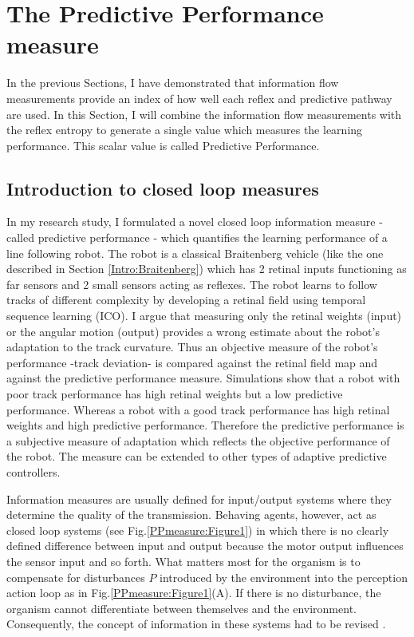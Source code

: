 \section{The Predictive Performance measure \label{Chapter8:Predictive Performance}}

In the previous Sections, I have demonstrated that information flow measurements 
provide an index of how well each reflex and predictive pathway are used.
In this Section, I will combine the information flow measurements with the reflex entropy
to generate a single value which measures the learning performance.
This scalar value is called Predictive Performance.

\subsection{Introduction to closed loop measures}
In my research study, I formulated a novel closed loop information measure -
called predictive performance - which quantifies the learning
performance of a line following robot.  The robot is a classical
Braitenberg vehicle (like the one described in Section \ref{Intro:Braitenberg}) 
which has 2 retinal inputs functioning as far
sensors and 2 small sensors acting as reflexes. The robot learns to
follow tracks of different complexity by developing a retinal field
using temporal sequence learning (ICO).  I argue that measuring
only the retinal weights (input) or the angular motion (output)
provides a wrong estimate about the robot's adaptation to the track
curvature.  Thus an objective measure of the robot's performance
-track deviation- is compared against the retinal field map and
against the predictive performance measure.  Simulations show that a
robot with poor track performance has high retinal weights but a low
predictive performance. Whereas a robot with a good track
performance has high retinal weights and high predictive
performance.  Therefore the predictive performance is a subjective
measure of adaptation which reflects the objective performance of
the robot.  The measure can be extended to other types of adaptive
predictive controllers.

Information measures are usually defined for input/output systems
where they determine the quality of the transmission. Behaving agents,
however, act as closed loop systems (see Fig.\ref{PPmeasure:Figure1}) in which
there is no clearly defined difference between input and output because
the motor output influences the sensor input and so forth. What
matters most for the organism is to compensate for disturbances $P$
introduced by the environment into the perception action loop as in
Fig.\ref{PPmeasure:Figure1}(A). If there is no disturbance, the organism cannot
differentiate between themselves and the environment. Consequently,
the concept of information in these systems had to be revised
\citep{RadicalConstruct}.

